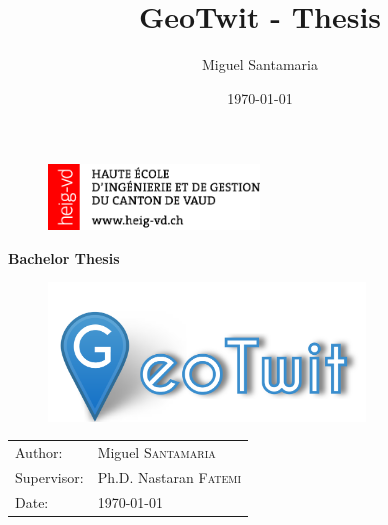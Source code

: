 \documentclass[a4paper,11pt]{report}
\title{GeoTwit - Thesis}
\author{Miguel Santamaria}
\date{\today}
\begin{document}
\thispagestyle{empty}
\begin{figure}[H]
\begin{center}
\includegraphics[width=0.5\textwidth, left]{figures/logo-heig.png}
\end{center}
\end{figure}

\vspace{30pt}
\begin{center}
\Huge \textbf{Bachelor Thesis}
\end{center}
\vspace{50pt}

\begin{figure}[H]
\begin{center}
\includegraphics[width=0.75\textwidth]{figures/logo.png}
\end{center}
\end{figure}

\vspace{90pt}

\begin{figure}[h]
\begin{center}
\end{center}
\end{figure}

\vspace{50pt}

\renewcommand{\arraystretch}{2.0}
\begin{tabular}{p{5cm}l}
\noindent\Large Author: & \noindent\Large Miguel \textsc{Santamaria}\\
\noindent\Large Supervisor: & \noindent\Large Ph.D. Nastaran \textsc{Fatemi}\\
\noindent\Large Date: & \noindent\Large\today
\end{tabular}
\renewcommand{\arraystretch}{1.0}
\end{document}
